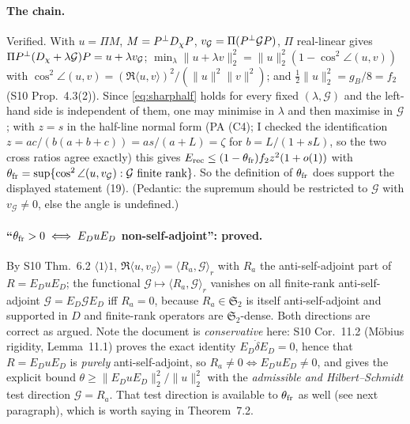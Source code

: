 \documentclass[11pt]{article}
\newcommand{\Stwo}{\mathfrak S_2}\newcommand{\Sone}{\mathfrak S_1}
\newcommand{\norm}[1]{\lVert #1\rVert}\newcommand{\abs}[1]{\lvert #1\rvert}
\newcommand{\ip}[2]{\langle #1,#2\rangle}\newcommand{\one}{\mathbf 1}
\newcommand{\Erec}{E_{\mathrm{rec}}}\newcommand{\Gs}{\mathcal G}
\begin{document}
\paragraph{The chain.}  Verified.  With $u=\Pi M$, $M=P^{\perp} D_\chi P$, $v_\Gs=\Pi(\Pperp\Gs P)$,
$\Pi$ real-linear gives $\Pi\Pperp(D_\chi+\lambda\Gs)P=u+\lambda v_\Gs$;
$\min_\lambda\norm{u+\lambda v}_2^2=\norm u_2^2(1-\cos^2\angle(u,v))$ with
$\cos^2\angle(u,v)=(\Re\ip uv)^2/(\norm u^2\norm v^2)$; and $\tfrac12\norm u_2^2=g_B/8=f_2$
(S10 Prop.~4.3(2)).  Since \eqref{eq:sharphalf} holds for every fixed $(\lambda,\Gs)$ and the
left-hand side is independent of them, one may minimise in $\lambda$ and then maximise in
$\Gs$; with $z=s$ in the half-line normal form (PA (C4); I checked the identification
$z=ac/(b(a+b+c))=as/(a+L)=\zeta$ for $b=L/(1+sL)$, so the two cross ratios agree exactly)
this gives
$\Erec\le(1-\theta_{\rm fr})f_2z^2(1+o(1))$ with
$\theta_{\rm fr}=\sup\{\cos^2\angle(u,v_\Gs):\Gs\ \text{finite rank}\}$.  So the definition of
$\theta_{\rm fr}$ does support the displayed statement (19).  (Pedantic: the supremum should
be restricted to $\Gs$ with $v_\Gs\ne0$, else the angle is undefined.)

\paragraph{``$\theta_{\rm fr}>0\iff E_DuE_D$ non-self-adjoint'': proved.}  By S10 Thm.~6.2
$\langle1\rangle1$, $\Re\ip u{v_\Gs}=\ip{R_a}\Gs_r$ with $R_a$ the anti-self-adjoint part of
$R=E_DuE_D$; the functional $\Gs\mapsto\ip{R_a}\Gs_r$ vanishes on all finite-rank
anti-self-adjoint $\Gs=E_D\Gs E_D$ iff $R_a=0$, because $R_a\in\Stwo$ is itself
anti-self-adjoint and supported in $D$ and finite-rank operators are $\Stwo$-dense.  Both
directions are correct as argued.  Note the document is \emph{conservative} here: S10
Cor.~11.2 (M\"obius rigidity, Lemma~11.1) proves the exact identity $E_D\dot\delta E_D=0$,
hence that $R=E_DuE_D$ is \emph{purely} anti-self-adjoint, so $R_a\ne0\iff E_DuE_D\ne0$, and
gives the explicit bound $\theta\ge\norm{E_DuE_D}_2^2/\norm u_2^2$ with the \emph{admissible
and Hilbert--Schmidt} test direction $\Gs=R_a$.  That test direction is available to
$\theta_{\rm fr}$ as well (see next paragraph), which is worth saying in Theorem~7.2.
\end{document}
